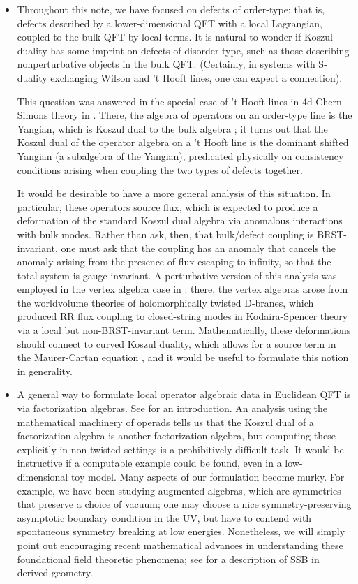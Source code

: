 \documentclass[11pt]{amsart}
\begin{document}
\begin{itemize}
\item Throughout this note, we have focused on defects of order-type: that is, defects described by a lower-dimensional QFT with a local Lagrangian, coupled to the bulk QFT by local terms. It is natural to wonder if Koszul duality has some imprint on defects of disorder type, such as those describing nonperturbative objects in the bulk QFT. (Certainly, in systems with S-duality exchanging Wilson and 't Hooft lines, one can expect a connection). 

This question was answered in the special case of 't Hooft lines in 4d Chern-Simons theory in \cite{CGY}. There, the algebra of operators on an order-type line is the Yangian, which is Koszul dual to the bulk algebra \cite{CYangian}; it turns out that the Koszul dual of the operator algebra on a 't Hooft line is the dominant shifted Yangian (a subalgebra of the Yangian), predicated physically on consistency conditions arising when coupling the two types of defects together. 

It would be desirable to have a more general analysis of this situation. In particular, these operators source flux, which is expected to produce a deformation of the standard Koszul dual algebra via anomalous interactions with bulk modes. Rather than ask, then, that bulk/defect coupling is BRST-invariant, one must ask that the coupling has an anomaly that cancels the anomaly arising from the presence of flux escaping to infinity, so that the total system is gauge-invariant. A perturbative version of this analysis was employed in the vertex algebra case in \cite{CP}: there, the vertex algebras arose from the worldvolume theories of holomorphically twisted D-branes, which produced RR flux coupling to closed-string modes in Kodaira-Spencer theory via a local but non-BRST-invariant term. Mathematically, these deformations should connect to curved Koszul duality, which allows for a source term in the Maurer-Cartan equation \cite{curved}, and it would be useful to formulate this notion in generality. 

\item A general way to formulate local operator algebraic data in Euclidean QFT is via factorization algebras. See \cite{CG1, CG2} for an introduction. An analysis using the mathematical machinery of operads tells us that the Koszul dual of a factorization algebra is another factorization algebra, but computing these explicitly in non-twisted settings is a prohibitively difficult task. It would be instructive if a computable example could be found, even in a low-dimensional toy model. Many aspects of our formulation become murky. For example, we have been studying augmented algebras, which are symmetries that preserve a choice of vacuum; one may choose a nice symmetry-preserving asymptotic boundary condition in the UV, but have to contend with spontaneous symmetry breaking at low energies. Nonetheless, we will simply point out encouraging recent mathematical advances in understanding these foundational field theoretic phenomena; see \cite{EG} for a description of SSB in derived geometry. 

\end{itemize} 
\end{document}
